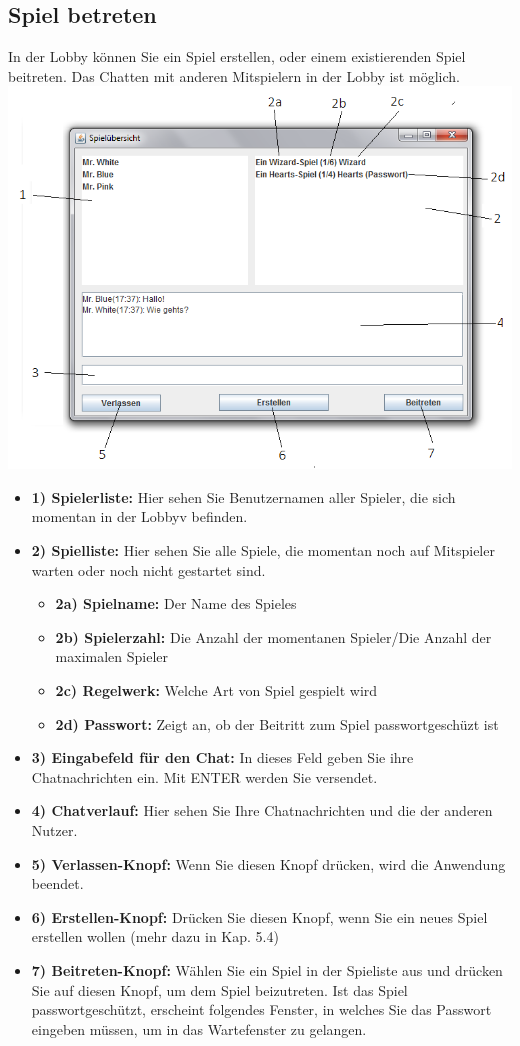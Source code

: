 \documentclass[titlepage,10pt,a4paper]{article}
\begin{document}
\subsection{Spiel betreten}
In der \gls{Lobby} können Sie ein Spiel erstellen, oder einem existierenden Spiel beitreten. Das Chatten mit anderen Mitspielern in der \gls{Lobby} ist möglich.\\
\includegraphics[width=\textwidth]{Lobby-Fenster}
\begin{itemize}
	\item \textbf{1) Spielerliste:} Hier sehen Sie Benutzernamen aller Spieler, die sich momentan in der \gls{Lobby}v befinden.
	\item \textbf{2) Spielliste:} Hier sehen Sie alle Spiele, die momentan noch auf Mitspieler warten oder noch nicht gestartet sind.
	\begin{itemize}
		\item \textbf{2a) Spielname:} Der Name des Spieles
		\item \textbf{2b) Spielerzahl:} Die Anzahl der momentanen Spieler/Die Anzahl der maximalen Spieler
		\item \textbf{2c) Regelwerk:} Welche Art von Spiel gespielt wird
		\item \textbf{2d) Passwort:} Zeigt an, ob der Beitritt zum Spiel passwortgeschüzt ist
	\end{itemize}
	\item \textbf{3) Eingabefeld für den Chat:} In dieses Feld geben Sie ihre Chatnachrichten ein. Mit ENTER werden Sie versendet.
	\item \textbf{4) Chatverlauf:} Hier sehen Sie Ihre Chatnachrichten und die der anderen Nutzer.
	\item \textbf{5) Verlassen-Knopf:} Wenn Sie diesen Knopf drücken, wird die Anwendung beendet.
	\item \textbf{6) Erstellen-Knopf:} Drücken Sie diesen Knopf, wenn Sie ein neues Spiel erstellen wollen (mehr dazu in Kap. 5.4)
	\item \textbf{7) Beitreten-Knopf:} Wählen Sie ein Spiel in der Spieliste aus und drücken Sie auf diesen Knopf, um dem Spiel beizutreten. Ist das Spiel passwortgeschützt, erscheint folgendes Fenster, in welches Sie das Passwort eingeben müssen, um in das \gls{Wartefenster} zu gelangen.
\end{itemize}
\end{document}
